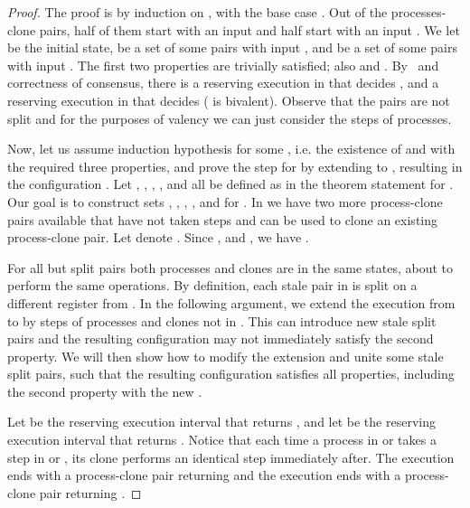 \begin{proof}
The proof is by induction on , with the base case .
Out of the  processes-clone pairs, 
  half of them start with an input  and half start with an input .
We let  be the initial state,
   be a set of some  pairs with input , and
   be a set of some  pairs with input .
The first two properties are trivially satisfied; also  and .
By~ and correctness of consensus,
  there is a reserving execution in  that decides ,
  and a reserving execution in  that decides  ( is bivalent).
Observe that the pairs are not split and for the purposes of valency we can just consider the steps of processes.

Now, let us assume induction hypothesis for some , i.e. the existence of  and  with the required three properties,
  and prove the step for  by extending  to , resulting in the configuration .
Let , , , ,  and  all be defined as in the theorem statement for . 
  Our goal is to construct sets , , , ,  and  for . 
In  we have two more process-clone pairs available that have not taken steps and 
  can be used to clone an existing process-clone pair.
Let  denote .
Since ,  and , we have .

For all but  split pairs both processes and clones are in the same states, 
  about to perform the same operations.
By definition, each stale pair in  is split on a different register from .
In the following argument, we extend the execution from  to  by steps of processes and clones not in .
This can introduce new stale split pairs and the resulting configuration  
  may not immediately satisfy the second property.
We will then show how to modify the extension and unite some stale split pairs, 
  such that the resulting configuration satisfies all properties, including the second property with the new .
	
Let  be the reserving execution interval that returns ,
  and let  be the reserving execution interval that returns .
Notice that each time a process in  or  takes a step in  or , 
  its clone performs an identical step immediately after.
The execution  ends with a process-clone pair  returning  and 
  the execution  ends with a process-clone pair  returning . 


\end{proof}
